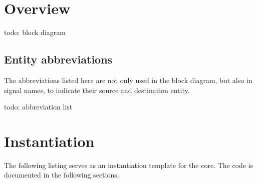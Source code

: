 \documentclass[10pt]{article}
\begin{document}
\clearpage
\section{Overview}

todo: block diagram

\subsection{Entity abbreviations}
\label{subsec:entity-abbreviations}

The abbreviations listed here are not only used in the block diagram, but also in signal names, to indicate their source and destination entity.

todo: abbreviation list

\clearpage
\section{Instantiation}

The following listing serves as an instantiation template for the core. The code is documented in the following sections.
\end{document}
